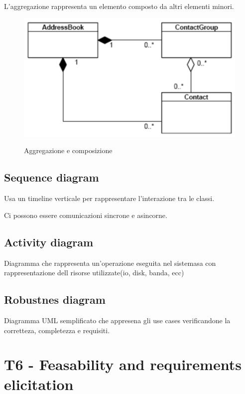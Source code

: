 \documentclass{article}
\begin{document}
L'aggregazione rappresenta un elemento composto da altri elementi minori.


\begin{figure}[h!]
    \centering
    \includegraphics[width=0.3\linewidth]{imgs/7 - aggregazione.png}
    \label{fig:aggregazione}
    \caption{Aggregazione e composizione}
\end{figure}

\subsection{Sequence diagram}
Usa un timeline verticale per rappresentare l'interazione tra le classi.

Ci possono essere comunicazioni sincrone e asincorne.
\subsection{Activity diagram}
Diagramma che rappresenta un'operazione eseguita nel sistemasa con rappresentazione
dell risorse utilizzate(io, disk, banda, ecc)

\subsection{Robustnes diagram}

Diagramma UML semplificato che appresena gli use cases verificandone la corretteza, 
completezza e requisiti.

\section{T6 - Feasability and requirements elicitation}
\end{document}

